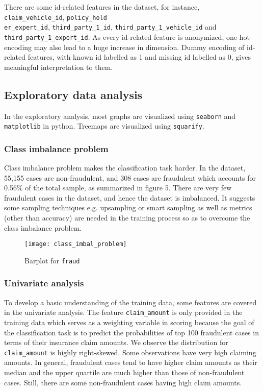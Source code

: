 \documentclass[12pt]{article}
\begin{document}
There are some id-related features in the dataset, for instance, \texttt{claim\_vehicle\_id}, \texttt{policy\_hold\\er\_expert\_id}, \texttt{third\_party\_1\_id}, \texttt{third\_party\_1\_vehicle\_id} and \texttt{third\_party\_1\_expert\_id}. As every id-related feature is anonymized, one hot encoding may also lead to a huge increase in dimension. Dummy encoding of id-related features, with known id labelled as 1 and missing id labelled as 0, gives meaningful interpretation to them. 

\subsection*{Exploratory data analysis}

In the exploratory analysis, most graphs are visualized using \texttt{seaborn} and \texttt{matplotlib} in python. Treemaps are visualized using \texttt{squarify}.

\subsubsection*{Class imbalance problem}

Class imbalance problem makes the classification task harder. In the dataset, 55,155 cases are non-fraudulent, and 308 cases are fraudulent which accounts for 0.56\% of the total sample, as summarized in figure 5. There are very few fraudulent cases in the dataset, and hence the dataset is imbalanced. It suggests some sampling techniques e.g. upsampling or smart sampling as well as metrics (other than accuracy) are needed in the training process so as to overcome the class imbalance problem.

\begin{figure}[h]
\centering
\texttt{[image: class\_imbal\_problem]}
\caption{Barplot for \texttt{fraud}}
\end{figure}

\vspace{-1cm}
\subsubsection*{Univariate analysis}

To develop a basic understanding of the training data, some features are covered in the univariate analysis. The feature \texttt{claim\_amount} is only provided in the training data which serves as a weighting variable in scoring because the goal of the classification task is to predict the probabilities of top 100 fraudulent cases in terms of their insurance claim amounts. We observe the distribution for \texttt{claim\_amount} is highly right-skewed. Some observations have very high claiming amounts. In general, fraudulent cases tend to have higher claim amounts as their median and the upper quartile are much higher than those of non-fraudulent cases. Still, there are some non-fraudulent cases having high claim amounts. 
\end{document}
